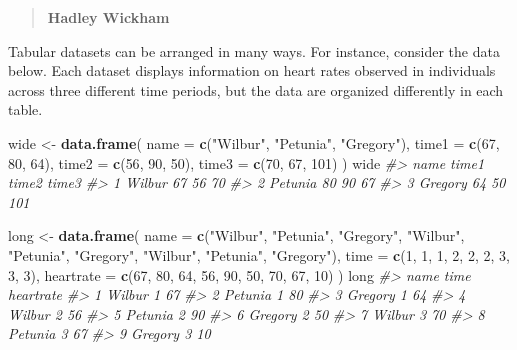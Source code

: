 \documentclass[]{book}
\newenvironment{Shaded}{\begin{snugshade}}{\end{snugshade}}
\newcommand{\KeywordTok}[1]{\textcolor[rgb]{0.13,0.29,0.53}{\textbf{#1}}}
\newcommand{\DataTypeTok}[1]{\textcolor[rgb]{0.13,0.29,0.53}{#1}}
\newcommand{\DecValTok}[1]{\textcolor[rgb]{0.00,0.00,0.81}{#1}}
\newcommand{\StringTok}[1]{\textcolor[rgb]{0.31,0.60,0.02}{#1}}
\newcommand{\CommentTok}[1]{\textcolor[rgb]{0.56,0.35,0.01}{\textit{#1}}}
\newcommand{\NormalTok}[1]{#1}
\begin{document}
\begin{quote}
\textbf{Hadley Wickham}
\end{quote}

Tabular datasets can be arranged in many ways. For instance, consider
the data below. Each dataset displays information on heart rates
observed in individuals across three different time periods, but the
data are organized differently in each table.

\begin{Shaded}
\begin{Highlighting}[]
\NormalTok{wide <-}\StringTok{ }\KeywordTok{data.frame}\NormalTok{(}
  \DataTypeTok{name =} \KeywordTok{c}\NormalTok{(}\StringTok{"Wilbur"}\NormalTok{, }\StringTok{"Petunia"}\NormalTok{, }\StringTok{"Gregory"}\NormalTok{),}
  \DataTypeTok{time1 =} \KeywordTok{c}\NormalTok{(}\DecValTok{67}\NormalTok{, }\DecValTok{80}\NormalTok{, }\DecValTok{64}\NormalTok{),}
  \DataTypeTok{time2 =} \KeywordTok{c}\NormalTok{(}\DecValTok{56}\NormalTok{, }\DecValTok{90}\NormalTok{, }\DecValTok{50}\NormalTok{),}
  \DataTypeTok{time3 =} \KeywordTok{c}\NormalTok{(}\DecValTok{70}\NormalTok{, }\DecValTok{67}\NormalTok{, }\DecValTok{101}\NormalTok{)}
\NormalTok{)}
\NormalTok{wide}
\CommentTok{#>      name time1 time2 time3}
\CommentTok{#> 1  Wilbur    67    56    70}
\CommentTok{#> 2 Petunia    80    90    67}
\CommentTok{#> 3 Gregory    64    50   101}

\NormalTok{long <-}\StringTok{ }\KeywordTok{data.frame}\NormalTok{(}
  \DataTypeTok{name =} \KeywordTok{c}\NormalTok{(}\StringTok{"Wilbur"}\NormalTok{, }\StringTok{"Petunia"}\NormalTok{, }\StringTok{"Gregory"}\NormalTok{, }\StringTok{"Wilbur"}\NormalTok{, }\StringTok{"Petunia"}\NormalTok{, }\StringTok{"Gregory"}\NormalTok{, }\StringTok{"Wilbur"}\NormalTok{, }\StringTok{"Petunia"}\NormalTok{, }\StringTok{"Gregory"}\NormalTok{),}
  \DataTypeTok{time =} \KeywordTok{c}\NormalTok{(}\DecValTok{1}\NormalTok{, }\DecValTok{1}\NormalTok{, }\DecValTok{1}\NormalTok{, }\DecValTok{2}\NormalTok{, }\DecValTok{2}\NormalTok{, }\DecValTok{2}\NormalTok{, }\DecValTok{3}\NormalTok{, }\DecValTok{3}\NormalTok{, }\DecValTok{3}\NormalTok{),}
  \DataTypeTok{heartrate =} \KeywordTok{c}\NormalTok{(}\DecValTok{67}\NormalTok{, }\DecValTok{80}\NormalTok{, }\DecValTok{64}\NormalTok{, }\DecValTok{56}\NormalTok{, }\DecValTok{90}\NormalTok{, }\DecValTok{50}\NormalTok{, }\DecValTok{70}\NormalTok{, }\DecValTok{67}\NormalTok{, }\DecValTok{10}\NormalTok{)}
\NormalTok{)}
\NormalTok{long}
\CommentTok{#>      name time heartrate}
\CommentTok{#> 1  Wilbur    1        67}
\CommentTok{#> 2 Petunia    1        80}
\CommentTok{#> 3 Gregory    1        64}
\CommentTok{#> 4  Wilbur    2        56}
\CommentTok{#> 5 Petunia    2        90}
\CommentTok{#> 6 Gregory    2        50}
\CommentTok{#> 7  Wilbur    3        70}
\CommentTok{#> 8 Petunia    3        67}
\CommentTok{#> 9 Gregory    3        10}
\end{Highlighting}
\end{Shaded}
\end{document}

